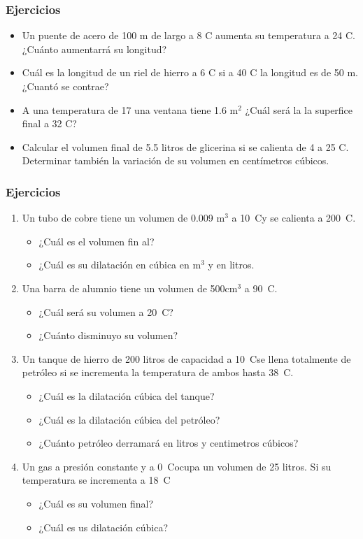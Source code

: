 \documentclass[handout]{beamer}
\newcommand{\celsius}{\textdegree~C}
\newcommand{\units}[2]{#1$^{#2}$}
\begin{document}
\begin{frame}[allowframebreaks,t]
  \frametitle{Ejercicios}
  \begin{itemize}
  \item Un puente de acero de 100 m de largo a 8 \textdegree C aumenta su temperatura a 24
    \textdegree C. ¿Cuánto aumentarrá su longitud?
  \item Cuál es la longitud de un riel de hierro a 6 \textdegree C si a 40 \textdegree C
    la longitud es de 50 m. ¿Cuantó se contrae?
  \item A una temperatura de 17 \textdegree una ventana tiene 1.6 m$^2$ ¿Cuál será la
    la superfice final a 32 \textdegree C?
  \item Calcular el volumen final de  5.5 litros de glicerina si se calienta de 4
    \textdegree a 25 \textdegree C. Determinar también la variación de su volumen en
    centímetros cúbicos.
  \end{itemize}
\end{frame}




\begin{frame}[allowframebreaks,t]
  \frametitle{Ejercicios}
  \begin{enumerate}
  \item Un tubo de cobre tiene un volumen de 0.009 \units{m}{3} a 10\celsius y se calienta
    a 200\celsius.
    \begin{itemize}
    \item ¿Cuál es el volumen fin al?
    \item ¿Cuál es su dilatación en cúbica en \units{m}{3} y en litros.
    \end{itemize}
  \item Una barra de alumnio tiene un volumen de 500\units{cm}{3} a 90\celsius.
    \begin{itemize}
    \item ¿Cuál será su volumen a 20\celsius?
    \item ¿Cuánto disminuyo su volumen?
    \end{itemize}
  \item Un tanque de hierro de 200 litros de capacidad a 10\celsius se llena totalmente de
    petróleo si se incrementa la temperatura de ambos hasta 38\celsius.
    \begin{itemize}
    \item ¿Cuál es la dilatación cúbica del tanque?
    \item ¿Cuál es la dilatación cúbica del petróleo?
    \item ¿Cuánto petróleo derramará en litros y centimetros cúbicos?
    \end{itemize}
  \item Un gas a presión constante y a 0\celsius ocupa un volumen de 25 litros. Si su
    temperatura se incrementa a 18\celsius
    \begin{itemize}
    \item ¿Cuál es su volumen final?
    \item ¿Cuál es us dilatación cúbica?
    \end{itemize}

  \end{enumerate}
\end{frame}
\end{document}
